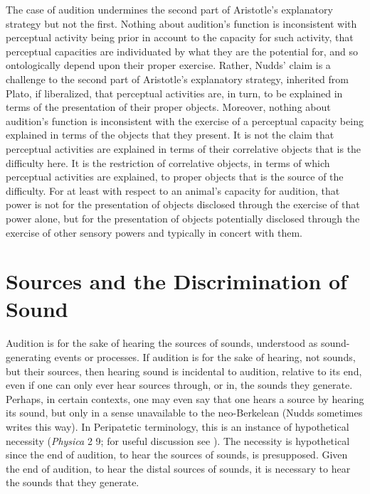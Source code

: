 The case of audition undermines the second part of Aristotle's explanatory strategy but not the first. Nothing about audition's function is inconsistent with perceptual activity being prior in account to the capacity for such activity, that perceptual capacities are individuated by what they are the potential for, and so ontologically depend upon their proper exercise. Rather, Nudds' claim is a challenge to the second part of Aristotle's explanatory strategy, inherited from Plato, if liberalized, that perceptual activities are, in turn, to be explained in terms of the presentation of their proper objects. Moreover, nothing about audition's function is inconsistent with the exercise of a perceptual capacity being explained in terms of the objects that they present. It is not the claim that perceptual activities are explained in terms of their correlative objects that is the difficulty here. It is the restriction of correlative objects, in terms of which perceptual activities are explained, to proper objects that is the source of the difficulty. For at least with respect to an animal's capacity for audition, that power is not for the presentation of objects disclosed through the exercise of that power alone, but for the presentation of objects potentially disclosed through the exercise of other sensory powers and typically in concert with them.


\section{Sources and the Discrimination of Sound} %
\label{sec:sources_and_the_discrimination_of_sound}

Audition is for the sake of hearing the sources of sounds, understood as sound-generating events or processes. If audition is for the sake of hearing, not sounds, but their sources, then hearing sound is incidental to audition, relative to its end, even if one can only ever hear sources through, or in, the sounds they generate. Perhaps, in certain contexts, one may even say that one hears a source by hearing its sound, but only in a sense unavailable to the neo-Berkelean (Nudds sometimes writes this way). In Peripatetic terminology, this is an instance of hypothetical necessity (\emph{Physica} 2 9; for useful discussion see \citealt{Charles:1988as}). The necessity is hypothetical since the end of audition, to hear the sources of sounds, is presupposed. Given the end of audition, to hear the distal sources of sounds, it is necessary to hear the sounds that they generate.


